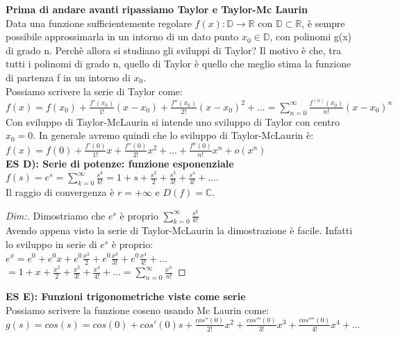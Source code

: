 \pagebreak

\textbf{Prima di andare avanti ripassiamo Taylor e Taylor-Mc Laurin}\\
Data una funzione sufficientemente regolare $ f(x):\mathbb{D} \longrightarrow \mathbb{R} $ con $ \mathbb{D} \subset \mathbb{R} $, è sempre possibile approssimarla in un intorno di un dato punto $ x_0 \in \mathbb{D} $, con polinomi g(x) di grado n. Perchè allora si studiano gli sviluppi di Taylor? Il motivo è che, tra tutti i polinomi di grado n, quello di Taylor è quello che meglio stima la funzione di partenza f in un intorno di $ x_0 $.\\
Possiamo scrivere la serie di Taylor come:\\
 $ f(x) = f(x_0) + \frac{ f'(x_0)}{1!} (x-x_0) + \frac{ f''(x_0)}{2!} (x-x_0)^2 +... = \sum_{n=0}^\infty \frac{ f^{(n)}(x_0) }{n!} (x-x_0)^n$\\
Con sviluppo di Taylor-McLaurin si intende uno sviluppo di Taylor con centro $x_0=0$.
In generale avremo quindi che lo sviluppo di Taylor-McLaurin è:\\
$ f(x) = f(0) + \frac{ f'(0)}{1!} x + \frac{ f''(0)}{2!} x^2+... + \frac{ f^{n}(0)}{n!} x^n+ o(x^n)$ \\

\textbf{ES D): Serie di potenze: funzione esponenziale}\\
$ f(s) = e^{s} = \sum_{k=0}^\infty \frac{s^{k}}{k!} = 1 +s + \frac{s^2}{2} + \frac{s^3}{3!} + \frac{s^4}{4!}+... $.\\
Il raggio di convergenza è $ r = +\infty$ e $ D(f)= \mathbb{C}$.\\

\begin{proof}[Dim:] Dimostriamo che $ e^{s} $ è proprio $\sum_{k=0}^\infty \frac{s^{k}}{k!} $\\ 
	Avendo appena visto la serie di Taylor-McLaurin la dimostrazione è facile. Infatti lo sviluppo in serie di $ e^{s} $ è proprio:\\
	$ e^{x} = e^0 + e^0 x + e^0 \frac{x^2}{2} + e^0 \frac{x^3}{3!} + e^0 \frac{x^4}{4!} +... $ \\
	$ = 1 + x + \frac{x^2}{2} + \frac{x^3}{3!} + \frac{x^4}{4!}+... = \sum_{n=0}^\infty \frac{x^{n}}{n!}$ 
\end{proof}


\textbf{ES E): Funzioni trigonometriche viste come serie}\\
Possiamo scrivere la funzione coseno usando Mc Laurin come:\\
$ g(s) = cos(s) = cos(0) + cos'(0)s + \frac{ cos''(0)}{2!} x^2 + \frac{ cos'''(0)}{3!} x^3 + \frac{ cos''''(0)}{4!} x^4 + ... $\\

